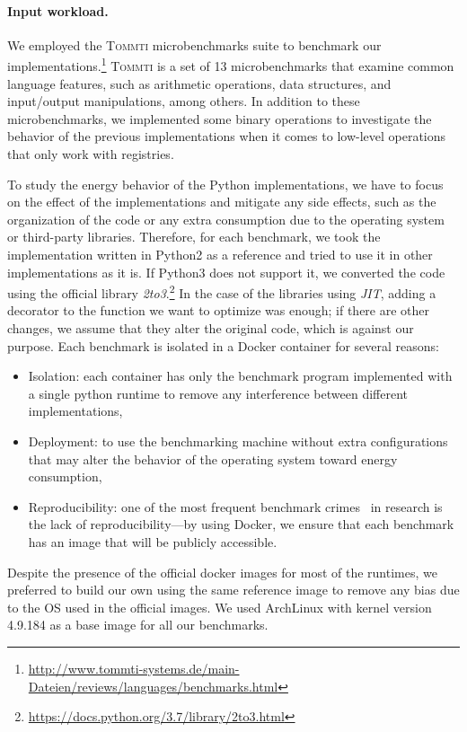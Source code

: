 \paragraph{Input workload.}
We employed the \textsc{Tommti} microbenchmarks suite to benchmark our implementations.\footnote{\url{http://www.tommti-systems.de/main-Dateien/reviews/languages/benchmarks.html}}
\textsc{Tommti} is a set of 13 microbenchmarks that examine common language features, such as arithmetic operations, data structures, and input/output manipulations, among others.
In addition to these microbenchmarks, we implemented some binary operations to investigate the behavior of the previous implementations when it comes to low-level operations that only work with registries.

To study the energy behavior of the Python implementations, we have to focus on the effect of the implementations and mitigate any side effects, such as the organization of the code or any extra consumption due to the operating system or third-party libraries.
Therefore, for each benchmark, we took the implementation written in Python2 as a reference and tried to use it in other implementations as it is.
If Python3 does not support it, we converted the code using the official library \emph{2to3}.\footnote{\url{https://docs.python.org/3.7/library/2to3.html}}
In the case of the libraries using \emph{JIT}, adding a decorator to the function we want to optimize was enough; if there are other changes, we assume that they alter the original code, which is against our purpose.
Each benchmark is isolated in a Docker container for several reasons:
\begin{itemize}
      \item Isolation: each container has only the benchmark program implemented with a single python runtime to remove any interference between different implementations,
      \item Deployment: to use the benchmarking machine without extra configurations that may alter the behavior of the operating system toward energy consumption,
      \item Reproducibility: one of the most frequent benchmark crimes~\cite{DBLP:journals/corr/abs-1801-02381} in research is the lack of reproducibility---by using Docker, we ensure that each benchmark has an image that will be publicly accessible.
\end{itemize}

Despite the presence of the official docker images for most of the runtimes, we preferred to build our own using the same reference image to remove any bias due to the OS used in the official images.
We used ArchLinux with kernel version 4.9.184 as a base image for all our benchmarks.

